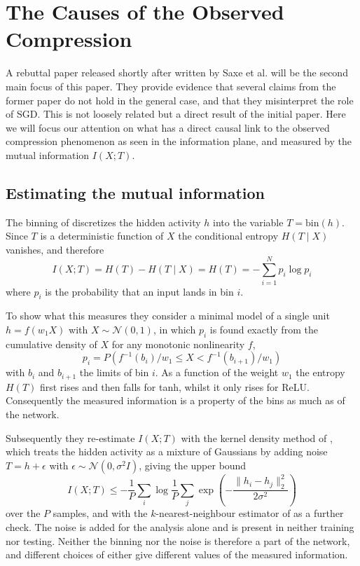 \section{The Causes of the Observed Compression}\label{sec:compression}
A rebuttal paper released shortly after \cite{shwartzziv2017} written by Saxe et
al. \cite{saxe2018} will be the second main focus of this paper.
They provide evidence that several claims from the former paper
do not hold in the general case, and that they misinterpret the role of SGD.
This is not loosely related but a direct result of the initial paper.
Here we will focus our attention on what has a direct causal link to
the observed compression phenomenon as seen in the information plane, and
measured by the mutual information $I(X; T)$.

\subsection{Estimating the mutual information}\label{subsec:estimating}
The binning of \cite{shwartzziv2017} discretizes the hidden activity $h$ into
the variable $T=\mathrm{bin}(h)$. Since $T$ is a deterministic function of $X$
the conditional entropy $H(T\mid X)$ vanishes, and therefore
\begin{equation}
	I(X;T) = H(T)-H(T\mid X) = H(T) = -\sum_{i=1}^{N}p_i\log p_i
\end{equation}
where $p_i$ is the probability that an input lands in bin $i$.

To show what this measures they consider a minimal model of a single unit
$h=f(w_1X)$ with $X\sim\mathcal{N}(0,1)$, in which $p_i$ is found exactly from
the cumulative density of $X$ for any monotonic nonlinearity $f$,
\begin{equation}
	p_i = P\left(f^{-1}(b_i)/w_1 \leq X < f^{-1}(b_{i+1})/w_1\right)
\end{equation}
with $b_i$ and $b_{i+1}$ the limits of bin $i$. As a function of the weight
$w_1$ the entropy $H(T)$ first rises and then falls for tanh, whilst it only
rises for ReLU. Consequently the measured information is a property of the
bins as much as of the network.

Subsequently they re-estimate $I(X;T)$ with the kernel density method of
\cite{kolchinsky2017}, which treats the hidden activity as a mixture of
Gaussians by adding noise $T=h+\epsilon$ with
$\epsilon\sim\mathcal{N}(0,\sigma^2I)$, giving the upper bound
\begin{equation}
	I(X;T) \leq -\frac{1}{P}\sum_i\log\frac{1}{P}\sum_j
	\exp\left(-\frac{\lVert h_i-h_j\rVert_2^2}{2\sigma^2}\right)
\end{equation}
over the $P$ samples, and with the $k$-nearest-neighbour estimator of
\cite{kraskov2004} as a further check. The noise is added for the analysis
alone and is present in neither training nor testing. Neither the binning nor
the noise is therefore a part of the network, and different choices of either
give different values of the measured information.

